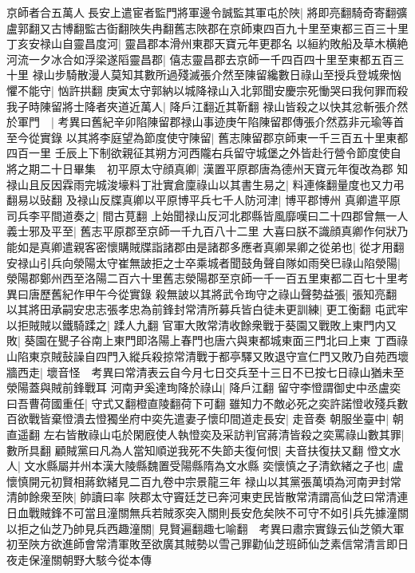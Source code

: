 京師者合五萬人長安上遣宦者監門將軍邊令誠監其軍屯於陜|{
	將即亮翻騎奇寄翻彍盧郭翻又古博翻監古衘翻陜失冉翻舊志陜郡在京師東四百九十里至東都三百三十里}
丁亥安禄山自靈昌度河|{
	靈昌郡本滑州東郡天寶元年更郡名}
以絙約敗船及草木横絶河流一夕冰合如浮梁遂䧟靈昌郡|{
	僖志靈昌郡去京師一千四百四十里至東都五百三十里}
禄山步騎散漫人莫知其數所過殘滅張介然至陳留纔數日祿山至授兵登城衆忷懼不能守|{
	忷許拱翻}
庚寅太守郭納以城降禄山入北郭聞安慶宗死慟哭曰我何罪而殺我子時陳留將士降者夾道近萬人|{
	降戶江翻近其靳翻}
禄山皆殺之以快其忿斬張介然於軍門　|{
	考異曰舊紀辛卯陷陳留郡禄山事迹庚午陷陳留郡傳張介然荔非元瑜等首至今從實錄}
以其將李庭望為節度使守陳留|{
	舊志陳留郡京師東一千三百五十里東都四百一里}
壬辰上下制欲親征其朔方河西隴右兵留守城堡之外皆赴行營令節度使自將之期二十日畢集　初平原太守顔真卿|{
	漢置平原郡唐為德州天寶元年復改為郡}
知禄山且反因霖雨完城浚壕料丁壯實倉廩祿山以其書生易之|{
	料連條翻量度也又力弔翻易以䜴翻}
及禄山反牒真卿以平原博平兵七千人防河津|{
	博平郡博州}
真卿遣平原司兵李平間道奏之|{
	間古莧翻}
上始聞禄山反河北郡縣皆風靡嘆曰二十四郡曾無一人義士邪及平至|{
	舊志平原郡至京師一千九百八十二里}
大喜曰朕不識顔真卿作何狀乃能如是真卿遣親客密懷購賊牒詣諸郡由是諸郡多應者真卿杲卿之從弟也|{
	從才用翻}
安禄山引兵向滎陽太守崔無詖拒之士卒乘城者聞鼓角聲自隊如雨癸巳祿山陷滎陽|{
	滎陽郡鄭州西至洛陽二百六十里舊志滎陽郡至京師一千一百五里東都二百七十里考異曰唐歷舊紀作甲午今從實錄}
殺無詖以其將武令珣守之祿山聲勢益張|{
	張知亮翻}
以其將田承嗣安忠志張孝忠為前鋒封常清所募兵皆白徒未更訓練|{
	更工衡翻}
屯武牢以拒賊賊以鐵騎蹂之|{
	蹂人九翻}
官軍大敗常清收餘衆戰于葵園又戰敗上東門内又敗|{
	葵園在甖子谷南上東門即洛陽上春門也唐六與東都城東面三門北曰上東}
丁酉祿山陷東京賊鼔譟自四門入縱兵殺掠常清戰于都亭驛又敗退守宣仁門又敗乃自苑西壞牆西走|{
	壞音怪　考異曰常清表云自今月七日交兵至十三日不已按七日祿山猶未至滎陽蓋與賊前鋒戰耳}
河南尹奚達珣降於祿山|{
	降戶江翻}
留守李憕謂御史中丞盧奕曰吾曹荷國重任|{
	守式又翻橙直陵翻荷下可翻}
雖知力不敵必死之奕許諾憕收殘兵數百欲戰皆棄憕潰去憕獨坐府中奕先遣妻子懷印間道走長安|{
	走音奏}
朝服坐臺中|{
	朝直遥翻}
左右皆散祿山屯於閑廐使人執憕奕及采訪判官蔣清皆殺之奕罵祿山數其罪|{
	數所具翻}
顧賊黨曰凡為人當知順逆我死不失節夫復何恨|{
	夫音扶復扶又翻}
憕文水人|{
	文水縣屬并州本漢大陵縣魏置受陽縣隋為文水縣}
奕懷慎之子清欽緒之子也|{
	盧懷慎開元初賢相蔣欽緒見二百九卷中宗景龍三年}
禄山以其黨張萬頃為河南尹封常清帥餘衆至陜|{
	帥讀曰率}
陜郡太守竇廷芝已奔河東吏民皆散常清謂高仙芝曰常清連日血戰賊鋒不可當且潼關無兵若賊豕突入關則長安危矣陜不可守不如引兵先據潼關以拒之仙芝乃帥見兵西趣潼關|{
	見賢遍翻趣七喻翻　考異曰肅宗實錄云仙芝領大軍初至陜方欲進師會常清軍敗至欲廣其賊勢以雪己罪勸仙芝班師仙芝素信常清言即日夜走保潼關朝野大駭今從本傳}
